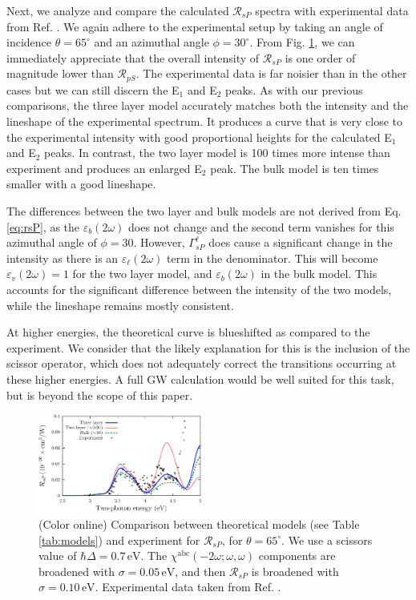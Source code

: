 Next, we analyze and compare the calculated $\mathcal{R}_{sP}$ spectra with
experimental data from Ref. \cite{mejiaPRB02}. We again adhere to the
experimental setup by taking an angle of incidence $\theta=65^{\circ}$ and an
azimuthal angle $\phi=30^\circ$. From Fig. \ref{fig:RsP}, we can immediately
appreciate that the overall intensity of $\mathcal{R}_{sP}$ is one order of
magnitude lower than $\mathcal{R}_{pS}$. The experimental data is far noisier
than in the other cases but we can still discern the E$_{1}$ and E$_{2}$ peaks.
As with our previous comparisons, the three layer model accurately matches both
the intensity and the lineshape of the experimental spectrum. It produces a
curve that is very close to the experimental intensity with good proportional
heights for the calculated E$_{1}$ and E$_{2}$ peaks. In contrast, the two layer
model is 100 times more intense than experiment and produces an enlarged E$_{2}$
peak. The bulk model is ten times smaller with a good lineshape.

The differences between the two layer and bulk models are not derived from Eq.
\eqref{eq:rsP}, as the $\varepsilon_{b}(2\omega)$ does not change and the second
term vanishes for this azimuthal angle of $\phi = 30$. However,
$\Gamma^{\ell}_{sP}$ does cause a significant change in the intensity as there
is an $\varepsilon_{\ell}(2\omega)$ term in the denominator. This will become
$\varepsilon_{v}(2\omega) = 1$ for the two layer model, and
$\varepsilon_{b}(2\omega)$ in the bulk model. This accounts for the significant
difference between the intensity of the two models, while the lineshape remains
mostly consistent.

At higher energies, the theoretical curve is blueshifted as compared to the
experiment. We consider that the likely explanation for this is the inclusion of
the scissor operator, which does not adequately correct the transitions
occurring at these higher energies. A full GW calculation would be well suited
for this task, but is beyond the scope of this paper.

\begin{figure}[t]
\centering
\includegraphics[width=0.48\textwidth]{figures/03-results/shgyield/fig6}
\caption{(Color online) Comparison between theoretical models (see Table
\ref{tab:models}) and experiment for $\mathcal{R}_{sP}$, for
$\theta=65^{\circ}$. We use a scissors value of $\hbar\Delta = 0.7\,\text{eV}$.
The $\chi^{\mathrm{abc}}(-2\omega;\omega,\omega)$ components are broadened with
$\sigma=0.05\,\text{eV}$, and then $\mathcal{R}_{sP}$ is broadened with
$\sigma=0.10\,\text{eV}$. Experimental data taken from Ref.
\cite{mejiaPRB02}.\label{fig:RsP}}
\end{figure}


